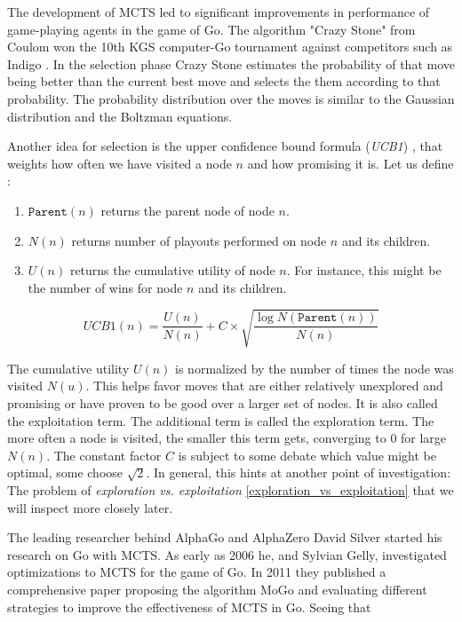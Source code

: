 The development of MCTS led to significant improvements in performance of game-playing agents in the game of Go. The algorithm "Crazy Stone" from Coulom won the 10th KGS computer-Go tournament against competitors such as Indigo \cite{bouzy_associating_2006}. In the selection phase Crazy Stone estimates the probability of that move being better than the current best move and selects the them according to that probability. The probability distribution over the moves is similar to the Gaussian distribution and the Boltzman equations. \cite[p. 4]{coulom_efficient_2007}

Another idea for selection is the upper confidence bound formula (\textit{UCB1}) \cite{auer_finite-time_nodate}, that weights how often we have visited a node $n$ and how promising it is. Let us define \cite[cf. p. 328]{russell_artificial_2021}:

\begin{enumerate}
    \item $\texttt{Parent}(n)$ returns the parent node of node $n$.
    \item $N(n) $ returns number of playouts performed on node $n$ and its children.
    \item $U(n) $ returns the cumulative utility of node $n$. For instance, this might be the number of wins for node $n$ and its children.
\end{enumerate}

\begin{equation}
    \textit{UCB1}(n) = \frac{U(n)}{N(n)} + C \times \sqrt{\frac{\log{N(\texttt{Parent}(n))}}{N(n)}}
\end{equation}

The cumulative utility $U(n)$ is normalized by the number of times the node was visited $N(u)$. This helps favor moves that are either relatively unexplored and promising or have proven to be good over a larger set of nodes. It is also called the exploitation term. The additional term is called the exploration term. The more often a node is visited, the smaller this term gets, converging to 0 for large $N(n)$. The constant factor $C$ is subject to some debate which value might be optimal, some choose $\sqrt{2}$. In general, this hints at another point of investigation: The problem of \textit{exploration vs. exploitation} \ref{exploration_vs_exploitation} that we will inspect more closely later.

The leading researcher behind AlphaGo and AlphaZero David Silver started his research on Go with MCTS. As early as 2006 he, and Sylvian Gelly, investigated optimizations to MCTS \cite{gelly_achieving_nodate} for the game of Go. In 2011 they published a comprehensive paper \cite{gelly_monte-carlo_2011} proposing the algorithm MoGo and evaluating different strategies to improve the effectiveness of MCTS in Go. Seeing that


